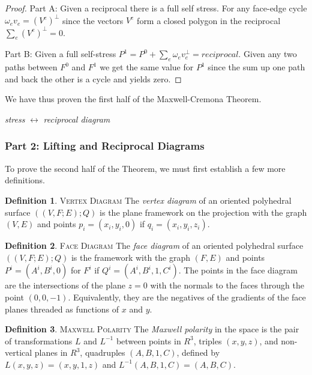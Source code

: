 \documentclass[11pt]{article}
\theoremstyle{definition}
\newtheorem{definition}{Definition}[section]
\begin{document}
	\begin{proof} 
		Part A: Given a reciprocal there is a full self stress.
		For any face-edge cycle $\omega_e v_e = (V^e)^{\bot}$ since the vectors $V^e$ form a closed polygon in the reciprocal $\sum_e(V^e)^\bot = 0$.

		Part B: Given a full self-stress $P^1 = P^0 + \sum_e \omega_ev_e^\bot = reciprocal$.
		Given any two paths between $F^0$ and $F^1$ we get the same value for $P^1$ since the sum up one path and back the other is a cycle and yields zero.
	\end{proof}
	
	We have thus proven the first half of the Maxwell-Cremona Theorem.

	\emph{stress} $\leftrightarrow$ \emph{reciprocal diagram}

\subsubsection{Part 2: Lifting and Reciprocal Diagrams}

	To prove the second half of the Theorem, we must first establish a few more definitions.
	
	\theoremstyle{definition}
	\begin{definition}{\textsc{Vertex Diagram}}
		The \emph{vertex diagram} of an oriented polyhedral surface $((V,F;E);Q)$ is the plane framework on the projection with the graph $(V,E)$ and points $p_i = (x_i,y_i,0)$ if $q_i = (x_i,y_i,z_i)$.
	\end{definition}
	
	\theoremstyle{definition}
	\begin{definition}{\textsc{Face Diagram}}
		The \emph{face diagram} of an oriented polyhedral surface $((V,F;E);Q)$ is the framework with the graph $(F,E)$ and points $P^i = (A^i,B^i,0)$ for $F^i$ if $Q^i = (A^i,B^i,1,C^i)$. 
		The points in the face diagram are the intersections of the plane $z=0$ with the normals to the faces through the point $(0,0,-1)$. 
		Equivalently, they are the negatives of the gradients of the face planes threaded as functions of $x$ and $y$.
	\end{definition}
	
	\theoremstyle{definition}
 	\begin{definition}{\textsc{Maxwell Polarity}}
 		The \emph{Maxwell polarity} in the space is the pair of transformations $L$ and $L^{-1}$ between points in $R^3$, triples $(x,y,z)$, and non-vertical planes in $R^3$, quadruples $(A,B,1,C)$, defined by $L(x,y,z)=(x,y,1,z)$ and $L^{-1}(A,B,1,C) = (A,B,C)$.
 	\end{definition}
	
\end{document}
